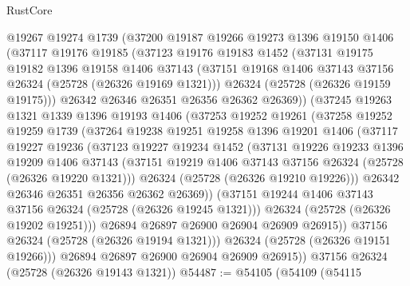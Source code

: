 \begin{lexlean}{RustCore}
\begin{coremodule}
        @19267
        @19274
        @1739
        (@37200
          @19187
          @19266
          @19273
          @1396
          @19150
          @1406
          (@37117
            @19176
            @19185
            (@37123
              @19176
              @19183
              @1452
              (@37131
                @19175
                @19182
                @1396
                @19158
                @1406
                @37143
                (@37151 @19168 @1406 @37143 @37156 @26324 (@25728 (@26326 @19169 @1321)))
                @26324
                (@25728 (@26326 @19159 @19175)))
              @26342
              @26346
              @26351
              @26356
              @26362
              @26369))
          (@37245
            @19263
            @1321
            @1339
            @1396
            @19193
            @1406
            (@37253
              @19252
              @19261
              (@37258
                @19252
                @19259
                @1739
                (@37264
                  @19238
                  @19251
                  @19258
                  @1396
                  @19201
                  @1406
                  (@37117
                    @19227
                    @19236
                    (@37123
                      @19227
                      @19234
                      @1452
                      (@37131
                        @19226
                        @19233
                        @1396
                        @19209
                        @1406
                        @37143
                        (@37151 @19219 @1406 @37143 @37156 @26324 (@25728 (@26326 @19220 @1321)))
                        @26324
                        (@25728 (@26326 @19210 @19226)))
                      @26342
                      @26346
                      @26351
                      @26356
                      @26362
                      @26369))
                  (@37151 @19244 @1406 @37143 @37156 @26324 (@25728 (@26326 @19245 @1321)))
                  @26324
                  (@25728 (@26326 @19202 @19251)))
                @26894
                @26897
                @26900
                @26904
                @26909
                @26915))
            @37156
            @26324
            (@25728 (@26326 @19194 @1321)))
          @26324
          (@25728 (@26326 @19151 @19266)))
        @26894
        @26897
        @26900
        @26904
        @26909
        @26915))
    @37156
    @26324
    (@25728 (@26326 @19143 @1321))
@54487 := @54105
    (@54109
      (@54115

\end{coremodule}
\end{lexlean}
